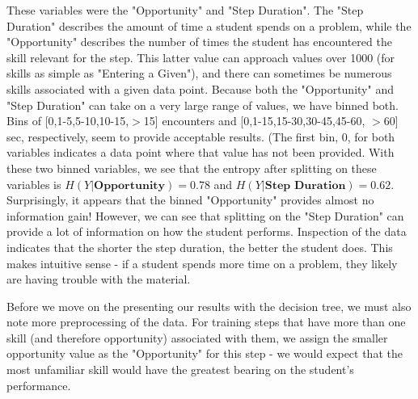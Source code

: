 \documentclass{article} %
\begin{document}
These variables were the "Opportunity" and "Step Duration". The "Step Duration" describes the amount of time a student spends on a problem, while the "Opportunity" describes the number of times the student has encountered the skill relevant for the step. This latter value can approach values over 1000 (for skills as simple as "Entering a Given"), and there can sometimes be numerous skills associated with a given data point. Because both the "Opportunity" and "Step Duration" can take on a very large range of values, we have binned both. Bins of [0,1-5,5-10,10-15,$>$15] encounters and [0,1-15,15-30,30-45,45-60, $>$60] sec, respectively, seem to provide acceptable results. (The first bin, 0, for both variables indicates a data point where that value has not been provided. With these two binned variables, we see that the entropy after splitting on these variables is $H(Y|\textbf{Opportunity}) = 0.78$ and $H(Y|\textbf{Step Duration}) = 0.62$. Surprisingly, it appears that the binned "Opportunity" provides almost no information gain! However, we can see that splitting on the "Step Duration" can provide a lot of information on how the student performs. Inspection of the data indicates that the shorter the step duration, the better the student does. This makes intuitive sense - if a student spends more time on a problem, they likely are having trouble with the material.

Before we move on the presenting our results with the decision tree, we must also note more preprocessing of the data. For training steps that have more than one skill (and therefore opportunity) associated with them, we assign the smaller opportunity value as the "Opportunity" for this step - we would expect that the most unfamiliar skill would have the greatest bearing on the student's performance.
\end{document}
